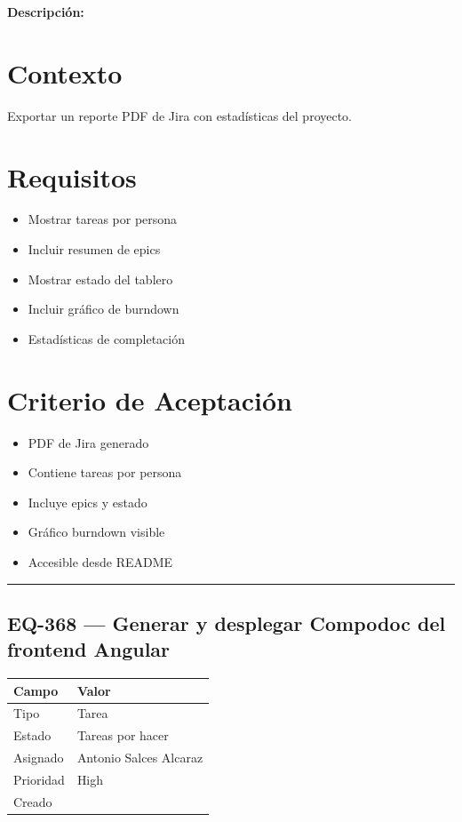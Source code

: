 \documentclass[
  spanish,
  11pt,
]{report}
\newcounter{none} %
\providecommand{\tightlist}{%
  \setlength{\itemsep}{0pt}\setlength{\parskip}{0pt}}
\begin{document}
\textbf{Descripción:}

\section{Contexto}\label{contexto-5}

Exportar un reporte PDF de Jira con estadísticas del proyecto.

\section{Requisitos}\label{requisitos-4}

\begin{itemize}
\tightlist
\item
  Mostrar tareas por persona
\item
  Incluir resumen de epics
\item
  Mostrar estado del tablero
\item
  Incluir gráfico de burndown
\item
  Estadísticas de completación
\end{itemize}

\section{Criterio de Aceptación}\label{criterio-de-aceptaciuxf3n-4}

\begin{itemize}
\tightlist
\item[$\square$]
  PDF de Jira generado
\item[$\square$]
  Contiene tareas por persona
\item[$\square$]
  Incluye epics y estado
\item[$\square$]
  Gráfico burndown visible
\item[$\square$]
  Accesible desde README
\end{itemize}

\begin{center}\rule{0.5\linewidth}{0.5pt}\end{center}

\subsection{EQ-368 --- Generar y desplegar Compodoc del frontend
Angular}\label{eq-368-generar-y-desplegar-compodoc-del-frontend-angular}

{\def\LTcaptype{none} %
\begin{longtable}[]{@{}ll@{}}
\toprule\noalign{}
Campo & Valor \\
\midrule\noalign{}
\endhead
\bottomrule\noalign{}
\endlastfoot
Tipo & Tarea \\
Estado & Tareas por hacer \\
Asignado & Antonio Salces Alcaraz \\
Prioridad & High \\
Creado & \\
\end{longtable}
}
\end{document}
